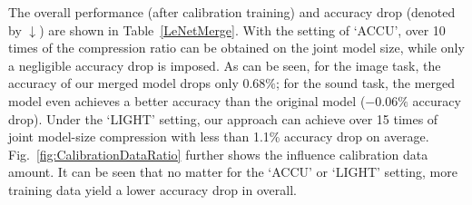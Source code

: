 \documentclass{article}
\begin{document}
	The overall performance (after calibration training) and accuracy drop (denoted by $\downarrow$) are shown in Table~\ref{LeNetMerge}.
	With the setting of `ACCU', over 10 times of the compression ratio can be obtained on the joint model size, while only a negligible accuracy drop is imposed.
	As can be seen, for the image task, the accuracy of our merged model drops only $0.68\%$; for the sound task, the merged model even achieves a better accuracy than the original model ($-0.06\%$ accuracy drop).
	Under the `LIGHT' setting, our approach can achieve over 15 times of joint model-size compression
	with less than 1.1\% accuracy drop on average.
	Fig.~\ref{fig:CalibrationDataRatio} further shows the influence calibration data amount.
	It can be seen that no matter for the `ACCU' or `LIGHT' setting, more training data yield a lower accuracy drop in overall.
	
	
	
\end{document}
